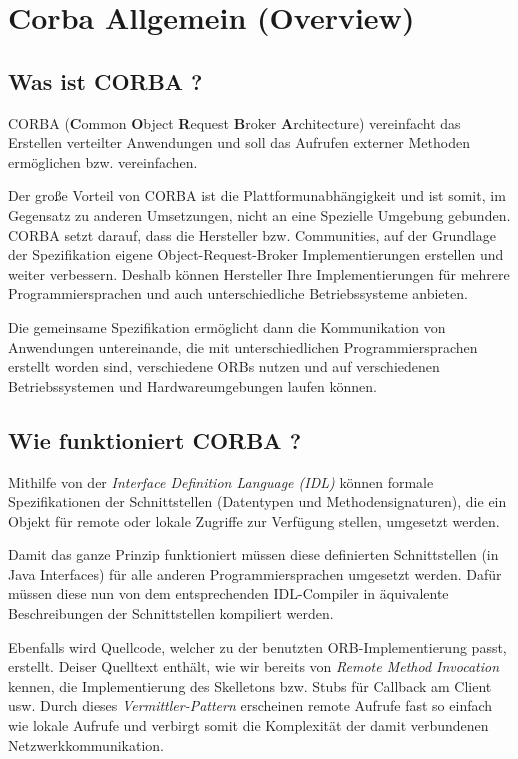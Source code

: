 \section{Corba Allgemein (Overview)}
\label{sec:Corba Allgemein (Overview)}


	\subsection{Was ist CORBA ?}

	CORBA (\textbf{C}ommon \textbf{O}bject \textbf{R}equest \textbf{B}roker \textbf{A}rchitecture) vereinfacht das Erstellen verteilter Anwendungen und soll das Aufrufen externer Methoden ermöglichen bzw. vereinfachen.
	
	Der große Vorteil von CORBA ist die Plattformunabhängigkeit und ist somit, im Gegensatz zu anderen Umsetzungen, nicht an eine Spezielle Umgebung gebunden.
	CORBA setzt darauf, dass die Hersteller bzw. Communities, auf der Grundlage der Spezifikation eigene Object-Request-Broker Implementierungen erstellen und weiter verbessern. Deshalb können Hersteller Ihre Implementierungen für mehrere Programmiersprachen und auch unterschiedliche Betriebssysteme anbieten.
	
	Die gemeinsame Spezifikation ermöglicht dann die Kommunikation von Anwendungen untereinande, die mit unterschiedlichen Programmiersprachen erstellt worden sind, verschiedene ORBs nutzen und auf verschiedenen Betriebssystemen und Hardwareumgebungen laufen können.

	\subsection{Wie funktioniert CORBA ?}
	
	Mithilfe von der \textit{Interface Definition Language (IDL)} können formale Spezifikationen der Schnittstellen (Datentypen und Methodensignaturen), die ein Objekt für remote oder lokale Zugriffe zur Verfügung stellen, umgesetzt werden.
	
	Damit das ganze Prinzip funktioniert müssen diese definierten Schnittstellen (in Java Interfaces) für alle anderen Programmiersprachen umgesetzt werden.
	Dafür müssen diese nun von dem entsprechenden IDL-Compiler in äquivalente Beschreibungen der Schnittstellen kompiliert werden.
	
	Ebenfalls wird Quellcode, welcher zu der benutzten ORB-Implementierung passt, erstellt. Deiser Quelltext enthält, wie wir bereits von \textit{Remote Method Invocation} kennen, die Implementierung des Skelletons bzw. Stubs für Callback am Client usw. Durch dieses \textit{Vermittler-Pattern} erscheinen remote Aufrufe fast so einfach wie lokale Aufrufe und verbirgt somit die Komplexität der damit verbundenen Netzwerkkommunikation.

